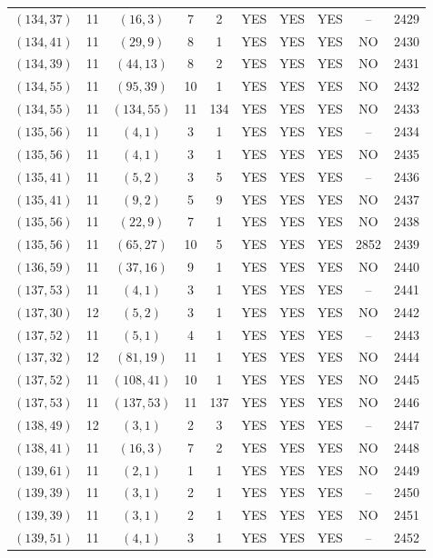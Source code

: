 \begin{longtable}{|c|c|c|c|c|c|c|c|c|c|}
$(134, 37)$ & 11 & $(16, 3)$ & 7 & 2 & YES & YES & YES & -- & 2429\\
$(134, 41)$ & 11 & $(29, 9)$ & 8 & 1 & YES & YES & YES & NO & 2430\\
$(134, 39)$ & 11 & $(44, 13)$ & 8 & 2 & YES & YES & YES & NO & 2431\\
$(134, 55)$ & 11 & $(95, 39)$ & 10 & 1 & YES & YES & YES & NO & 2432\\
$(134, 55)$ & 11 & $(134, 55)$ & 11 & 134 & YES & YES & YES & NO & 2433\\
$(135, 56)$ & 11 & $(4, 1)$ & 3 & 1 & YES & YES & YES & -- & 2434\\
$(135, 56)$ & 11 & $(4, 1)$ & 3 & 1 & YES & YES & YES & NO & 2435\\
$(135, 41)$ & 11 & $(5, 2)$ & 3 & 5 & YES & YES & YES & -- & 2436\\
$(135, 41)$ & 11 & $(9, 2)$ & 5 & 9 & YES & YES & YES & NO & 2437\\
$(135, 56)$ & 11 & $(22, 9)$ & 7 & 1 & YES & YES & YES & NO & 2438\\
$(135, 56)$ & 11 & $(65, 27)$ & 10 & 5 & YES & YES & YES & 2852 & 2439\\
$(136, 59)$ & 11 & $(37, 16)$ & 9 & 1 & YES & YES & YES & NO & 2440\\
$(137, 53)$ & 11 & $(4, 1)$ & 3 & 1 & YES & YES & YES & -- & 2441\\
$(137, 30)$ & 12 & $(5, 2)$ & 3 & 1 & YES & YES & YES & NO & 2442\\
$(137, 52)$ & 11 & $(5, 1)$ & 4 & 1 & YES & YES & YES & -- & 2443\\
$(137, 32)$ & 12 & $(81, 19)$ & 11 & 1 & YES & YES & YES & NO & 2444\\
$(137, 52)$ & 11 & $(108, 41)$ & 10 & 1 & YES & YES & YES & NO & 2445\\
$(137, 53)$ & 11 & $(137, 53)$ & 11 & 137 & YES & YES & YES & NO & 2446\\
$(138, 49)$ & 12 & $(3, 1)$ & 2 & 3 & YES & YES & YES & -- & 2447\\
$(138, 41)$ & 11 & $(16, 3)$ & 7 & 2 & YES & YES & YES & NO & 2448\\
$(139, 61)$ & 11 & $(2, 1)$ & 1 & 1 & YES & YES & YES & NO & 2449\\
$(139, 39)$ & 11 & $(3, 1)$ & 2 & 1 & YES & YES & YES & -- & 2450\\
$(139, 39)$ & 11 & $(3, 1)$ & 2 & 1 & YES & YES & YES & NO & 2451\\
$(139, 51)$ & 11 & $(4, 1)$ & 3 & 1 & YES & YES & YES & -- & 2452\\

\end{longtable}
